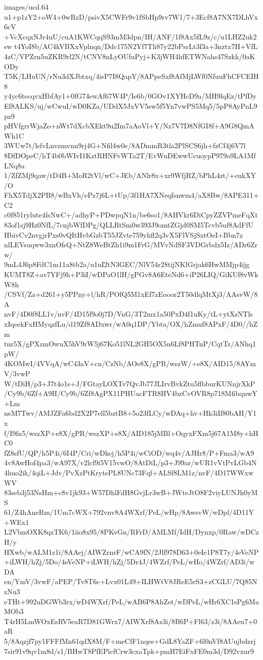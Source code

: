 \begin{filecontents*}{images/ucd.64}
u1+p1zY2+oW4+0wRzD/psivX5CWFr9v1fSbHp9rv7W1/7+3Ecf8A7NX7DLhVx6cV
+VcXcqxNJr4uU/cuA1KWCqqS93mM3dpn/IH/ANF/1f8Ax5fL9z/c/u1LHZ2uk2sw
t4YoI8b/AC4kVBXxVplnqn/Ddc175N2Yf7Tli87y22bPsrLt3f3a+3nztx7H+VfL
4zC/VPZrn5uZKR9rl2N/tCNV8nLyOUfuPyj+K3jWH4hfETWNahs47Szkk/0aKODy
T5K/LHuUN/rNu3dXJbtxq/4isP7I8QapY/8APpeSxf8AfMjLWf0NfuuFhCFCEIH8
y4yc6tecqvxHbfAy1+0fG74ewAf67W4P/Ie6b/0GOv1XYHcD9a/MH9lqEz/tPfDy
Ef8ALKS/uj/wCwuI/wD0KZa/UDdX5JxVV5sw5f5Yn7vwPS5Mq5/5pP8AyPnL9pz9
pHVfgrrWjaZo+nWt7dXcbXEkt9u2Im7aAoVl+Y/Nz7V7D8NfGI8f+A9G8QmAWh1C
3WUw7t/lsfvLnvzmvnn9rj4G+Nfil4w0e/8ADmmR3tla2PlSCS6jh+fzCf4j6V7l
8DfDOpeC/hT4b0bWIvI1KztRHNFvWTa2T/EvWuDEwwUcuoypP979o9LA1MfLNq8a
1/ZfZMj9qaw/tD4B+MoR2tVl/wC+JEb/ANlr8x+xr9WfjRZ/bPhL4zt/+eukXY/O
FhX5TdjX2PB8/wBxVh/ePz7j6L+tUp/3f1HA7XNeqfsnwm4/aX8Bw/8APE311+C2
c0f851rylute4fsNwC+/adhyP+PDwpqN1n/be6so1/8AHVkr6DiCpyZZVPmeFqXt
83of1sj9Hz0NfL/7cnjbWfDPg/QLLRtSm0w393J9omtZGjd0SM5Tcvb5uf8AdFfU
HbivCv2nvgjrPxs0vQItHvbGzbT55JZvte759yhfl2q3vX5FlVSjSxtOeI+Bbn7z
nlLEVsuqww3xnOfsQ+NtZ8WeBtZh1i9m1FrG/MVvNdSF3VDGrbdx5Iz/ADr6Zrw/
9mL4J6p8FdC1m11a8tb2a/u1uI2tN3GEC/NlV54r28tijNKlGrjak6HwMMjp4ijg
KUMT8Z+av7YFj9h+P3iI/wDPaO1lH/gPGv8A6EteNd6+iP26LIQ/GiKUf8vWkW8h
/CSVf/Za+d261+y5PPny+l/hR/POfQ5M1xEf7zEooor2T50dlqMtXj3/AAsvW/8A
nvF/4D0f8LL1v/nvF/4D15f9o0j7D/VnG/3T2mx1a50PxD4f1uKy/tL+ytXsNTls
xIqeekFxHMyqzfLu/d19Zf8ADxwr/wA0q1DP/Ybta/OX/hZmuf8APxF/4D0//hZm
tnr5X/gPXzmOwuX5hV9rW5j67Ko51lNL2GH5OX5n6Lf8PHTnP/CqtTz/ANhq1pW/
4KOMwI/4VVqA/wC43aV+cn/CzNb/AOe8X/gPR/wszW/+e8X/AID15/8AYmV/3vwP
W/tDiH/p3+J7t4o1s+J/FGtayLOXTv7QvJb77JLIrvBvkZtu5flbburKUNnjrXkP
/Cy9b/6Zf+A9H/Cy9b/6Zf8AgPX11PHUacFTR8HV4bzCvOVR8p718MfibqnwY+Lm
neM7Twv/AMJZFa6bd2X2P7ell5bztB8+5o23fLCy/wDAq+hv+Hk3iIf80bAH/Y1x
f/I9fn5/wszXP+e8X/gPR/wszXP+e8X/AID185jMBl+OqyxFXm5j67A1M8y+hHC0
fZ8sfU/QP/h5P4i/6I4P/Cri/wDkej/h5P4i/wCiOD/wq4v/AJHr8/P+Fma3/wA9
4v8AwHof4pa3/wA97X/v2lcf9i5V15vwO/8AtDiL/p3+J99ar/wUR1vVtPvLGb4N
4huo2ik/4qiL+Jdv/PvXzPtKrytePL8UNc73Fqf+ALSf8LM1z/nvF/4D17WWxwWV
83seb3j53NsHm+c8v1jk93+W57DhlFdH8GvjLr3wB+JWteJtO8F2viyLUNJh0yMS
61/Z4hAneRm/1Um7cWX+792vnv8A4WXrf/PeL/wHp/8AwsvW/wDpl/4D11Y+WEx1
L2VbmOXK8qzTK6/1iio8x95/8PKvGn/RFrD/AMLMf/IdH/Dynxp/0Raw/wDCzH/y
HXwb/wALM1z1i/8AAej/AIWZrnrF/wCA9fN/2Jlf978D63+0eIe1P8T7y/4eVeNP
+iLWH/hZj/5Do/4eVeNP+iLWH/hZj/5Dr4J/4WZrf/PeL/wHo/4WZrf/AD3i/wDA
en/YmV/3vwF/aPEP/Tv8T6c+Lvx01L49+ILHWtV8JReE5rS3+zCGLU/7Q85NzNu3
eTHt+992uDGWb3rx/wD4WXrf/PeL/wAB6P8AhZet/wDPeL/wHr6XC1sPg6MaMOb3
T4rH5LmWOxEsRV5eaR7D81GWrx7/AIWXrf8Az3i/8B6P+Fl63/z3i/8AAeu7+0aR
5/8Aqzjf7py1FFFfMn61qdX8M/F+meCfF1nqes+GdL8YaZF+6l0nVf8AUujbdzrj
7sir91v9qv1m8d/s1/BHwT8PfEPicfCrw3cxaTpk+pmH7EiFxFE0m3d/D92vxur9

\end{filecontents*}
